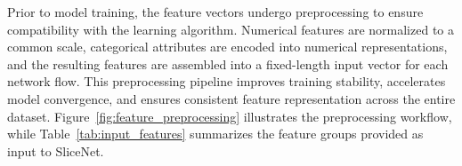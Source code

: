 \documentclass[12pt,a4paper]{report}
\begin{document}
	Prior to model training, the feature vectors undergo preprocessing to ensure compatibility with the learning algorithm. Numerical features are normalized to a common scale, categorical attributes are encoded into numerical representations, and the resulting features are assembled into a fixed-length input vector for each network flow. This preprocessing pipeline improves training stability, accelerates model convergence, and ensures consistent feature representation across the entire dataset. Figure~\ref{fig:feature_preprocessing} illustrates the preprocessing workflow, while Table~\ref{tab:input_features} summarizes the feature groups provided as input to SliceNet.
	

	
\end{document}
